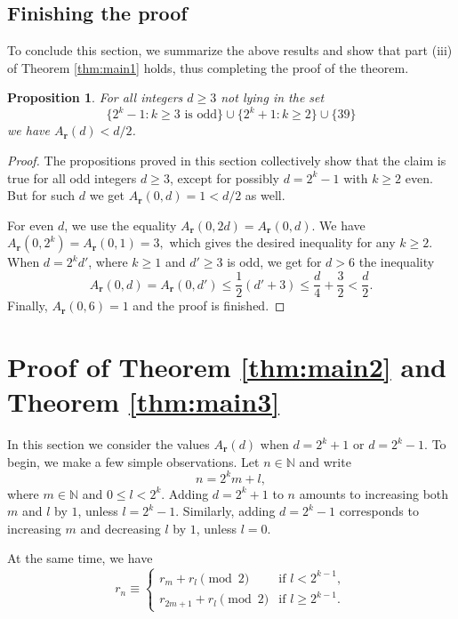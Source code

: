 \documentclass[a4paper,11pt]{amsart}
\newtheorem{prop}[thm]{Proposition}
\theoremstyle{definition}
\newcommand{\N}{\mathbb{N}}
\begin{document}
\subsection{Finishing the proof}

To conclude this section, we summarize the above results and show that part (iii) of Theorem \ref{thm:main1} holds, thus completing the proof of the theorem.

\begin{prop}
For all integers $d \geq 3$ not lying in the set
$$ \{ 2^k-1: k \geq 3 \text{ is odd} \} \cup \{ 2^k+1: k \geq 2   \} \cup \{39\} $$
we have $A_{\mathbf{r}}(d) < d/2$.
\end{prop}
\begin{proof}
The propositions proved in this section collectively show that the claim is true for all odd integers $d \geq 3$, except for possibly $d = 2^k-1$ with $k \geq 2$ even. But for such $d$ we get $A_{\mathbf{r}}(0,d) = 1 < d/2$ as well. 

For even $d$, we use the equality $A_{\mathbf{r}}(0,2d) = A_{\mathbf{r}}(0,d)$. We have $A_{\mathbf{r}}(0,2^k) = A_{\mathbf{r}}(0,1) = 3,$ which gives the desired inequality for any $k \geq 2$. When $d = 2^k d'$, where $k \geq 1$ and $d' \geq 3$ is odd, we get for $d > 6$ the inequality
$$ A_{\mathbf{r}}(0,d) = A_{\mathbf{r}}(0,d') \leq \frac{1}{2}(d'+3) \leq \frac{d}{4} + \frac{3}{2} < \frac{d}{2}.$$
Finally, $ A_{\mathbf{r}}(0,6) = 1$ and the proof is finished.
\end{proof}


\section{Proof of Theorem \ref{thm:main2} and Theorem \ref{thm:main3}} \label{sec:main2_main3}

In this section we consider the values $A_{\mathbf{r}}(d)$ when $d=2^k+1$ or $d=2^k-1$. To begin, we make a few simple observations. Let $n \in \N$ and write 
$$n = 2^k m + l,$$ 
where $m \in \N$ and $0 \leq l < 2^{k}$. Adding $d = 2^k+1$ to $n$ amounts to increasing both $m$ and $l$ by $1$, unless $l = 2^k-1$. Similarly, adding $d = 2^k-1$ corresponds to increasing $m$ and decreasing $l$ by $1$, unless $l=0$.

At the same time, we have
\begin{equation} \label{eq:RS_identity}
 r_{n}\equiv \begin{cases} 
r_{m} + r_{l} \pmod{2}  &\text{if } l <2^{k-1}, \\
 r_{2m+1} + r_{l} \pmod{2}  &\text{if } l \geq 2^{k-1}.
\end{cases}
\end{equation}
\end{document}
